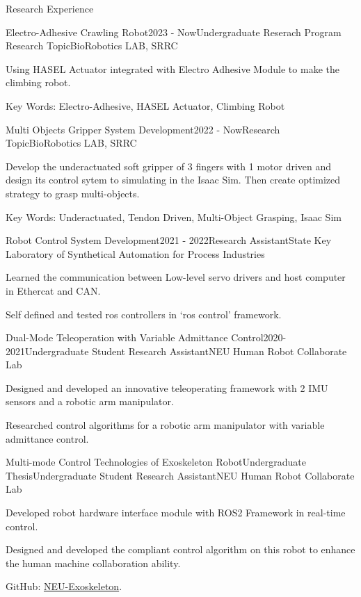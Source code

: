 \begin{rSection}{Research Experience}
\begin{rSubsection}{Electro-Adhesive Crawling Robot}{2023 - Now}{Undergraduate Reserach Program Research Topic}{BioRobotics LAB, SRRC}
  \item Using HASEL Actuator integrated with Electro Adhesive Module to make the climbing robot.
  \item Key Words: Electro-Adhesive, HASEL Actuator, Climbing Robot
\end{rSubsection}

\begin{rSubsection}{Multi Objects Gripper System Development}{2022 - Now}{Research Topic}{BioRobotics LAB, SRRC}
  \item Develop the underactuated soft gripper of 3 fingers with 1 motor driven and design its control sytem to simulating in the Isaac Sim. Then create optimized strategy to grasp multi-objects.
  \item Key Words: Underactuated, Tendon Driven, Multi-Object Grasping, Isaac Sim
\end{rSubsection}

\begin{rSubsection}{Robot Control System Development}{2021 - 2022}{Research Assistant}{State Key Laboratory of Synthetical Automation for Process Industries}
  \item Learned the communication between Low-level servo drivers and host computer in Ethercat and CAN.
  \item Self defined and tested ros controllers in `ros control' framework.
\end{rSubsection}

\begin{rSubsection}{Dual-Mode Teleoperation with Variable Admittance Control}{2020-2021}{Undergraduate Student Research Assistant}{NEU Human Robot Collaborate Lab}
  \item Designed and developed an innovative teleoperating framework with 2 IMU sensors and a robotic arm manipulator.
  \item Researched control algorithms for a robotic arm manipulator with variable admittance control.
\end{rSubsection}

\begin{rSubsection}{Multi-mode Control Technologies of Exoskeleton Robot}{Undergraduate Thesis}{Undergraduate Student Research Assistant}{NEU Human Robot Collaborate Lab}
  \item Developed robot hardware interface module with ROS2 Framework in real-time control.
  \item Designed and developed the compliant control algorithm on this robot to enhance the human machine collaboration ability.
  \item GitHub: \href{https://github.com/MingshanHe/NEU_Exoskeleton}{NEU-Exoskeleton}.
\end{rSubsection}


\end{rSection}
